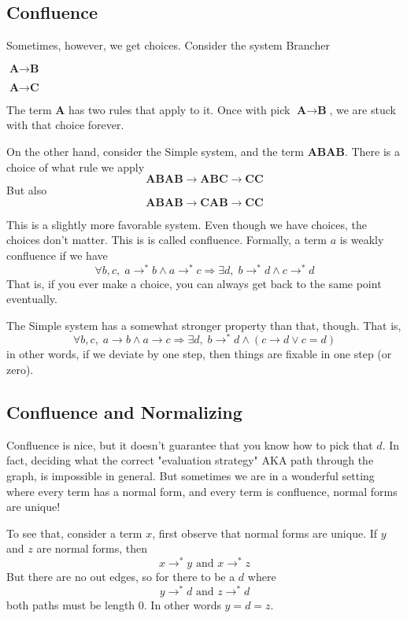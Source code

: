 \documentclass[12pt]{article}
\begin{document}
\subsection{Confluence}
Sometimes, however, we get choices. Consider the system Brancher
\begin{description}
    \item $\textbf{A} \rightarrow \textbf{B}$
    \item $\textbf{A} \rightarrow \textbf{C}$
\end{description}
The term $\textbf{A}$ has two rules that apply to it. 
Once with pick $\textbf{A} \rightarrow \textbf{B}$, we are stuck with that choice forever.

On the other hand, consider the Simple system, and the term \textbf{ABAB}.
There is a choice of what rule we apply
\[
  \textbf{ABAB} \rightarrow \textbf{ABC} \rightarrow \textbf{CC}
\]
But also
\[
  \textbf{ABAB} \rightarrow \textbf{CAB} \rightarrow \textbf{CC}
\]

This is a slightly more favorable system. Even though we have choices, the choices don't matter. 
This is is called confluence. 
Formally, a term $a$ is weakly confluence if we have 
\[
\forall b,c,\;  a \rightarrow^* b \land a \rightarrow^* c \Rightarrow \exists d,\; b \rightarrow^* d \land c \rightarrow^* d
\]
That is, if you ever make a choice, you can always get back to the same point eventually.

The Simple system has a somewhat stronger property than that, though. That is,
\[
\forall b,c,\;  a \rightarrow b \land a \rightarrow c \Rightarrow \exists d,\; b \rightarrow^* d \land (c \rightarrow d \lor c = d)
\]
in other words, if we deviate by one step, then things are fixable in one step (or zero).

\subsection{Confluence and Normalizing}
Confluence is nice, but it doesn't guarantee that you know how to pick that $d$. 
In fact, deciding what the correct "evaluation strategy" AKA path through the graph, is impossible in general.
But sometimes we are in a wonderful setting where every term has a normal form, and every term is confluence, normal forms are unique!

To see that, consider a term $x$, first observe that normal forms are unique.
If $y$ and $z$ are normal forms, then 
\[
x \rightarrow^* y \text{  and  } x \rightarrow^*z
\]
But there are no out edges, so for there to be a $d$ where
\[
y \rightarrow^* d \text{  and  } z \rightarrow^* d
\]
both paths must be length 0. In other words $y = d = z$.
\end{document}
